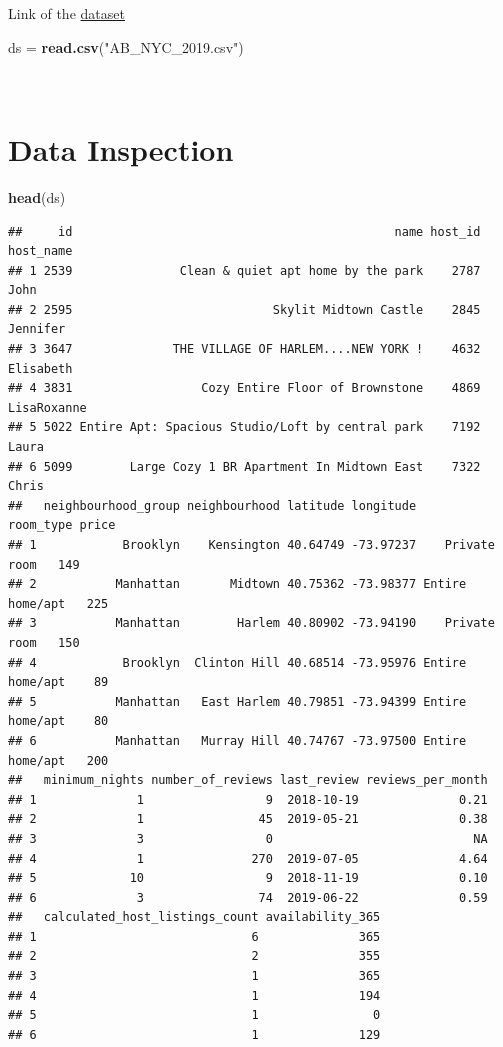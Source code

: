 \documentclass[
]{article}
\newenvironment{Shaded}{\begin{snugshade}}{\end{snugshade}}
\newcommand{\KeywordTok}[1]{\textcolor[rgb]{0.13,0.29,0.53}{\textbf{#1}}}
\newcommand{\NormalTok}[1]{#1}
\newcommand{\StringTok}[1]{\textcolor[rgb]{0.31,0.60,0.02}{#1}}
\begin{document}
Link of the
\href{https://www.kaggle.com/dgomonov/new-york-city-airbnb-open-data}{dataset}

\begin{Shaded}
\begin{Highlighting}[]
\NormalTok{ds =}\StringTok{ }\KeywordTok{read.csv}\NormalTok{(}\StringTok{"AB_NYC_2019.csv"}\NormalTok{)}
\end{Highlighting}
\end{Shaded}

~\\

\hypertarget{data-inspection}{%
\section{Data Inspection}\label{data-inspection}}

\begin{Shaded}
\begin{Highlighting}[]
\KeywordTok{head}\NormalTok{(ds)}
\end{Highlighting}
\end{Shaded}

\begin{verbatim}
##     id                                             name host_id   host_name
## 1 2539               Clean & quiet apt home by the park    2787        John
## 2 2595                            Skylit Midtown Castle    2845    Jennifer
## 3 3647              THE VILLAGE OF HARLEM....NEW YORK !    4632   Elisabeth
## 4 3831                  Cozy Entire Floor of Brownstone    4869 LisaRoxanne
## 5 5022 Entire Apt: Spacious Studio/Loft by central park    7192       Laura
## 6 5099        Large Cozy 1 BR Apartment In Midtown East    7322       Chris
##   neighbourhood_group neighbourhood latitude longitude       room_type price
## 1            Brooklyn    Kensington 40.64749 -73.97237    Private room   149
## 2           Manhattan       Midtown 40.75362 -73.98377 Entire home/apt   225
## 3           Manhattan        Harlem 40.80902 -73.94190    Private room   150
## 4            Brooklyn  Clinton Hill 40.68514 -73.95976 Entire home/apt    89
## 5           Manhattan   East Harlem 40.79851 -73.94399 Entire home/apt    80
## 6           Manhattan   Murray Hill 40.74767 -73.97500 Entire home/apt   200
##   minimum_nights number_of_reviews last_review reviews_per_month
## 1              1                 9  2018-10-19              0.21
## 2              1                45  2019-05-21              0.38
## 3              3                 0                            NA
## 4              1               270  2019-07-05              4.64
## 5             10                 9  2018-11-19              0.10
## 6              3                74  2019-06-22              0.59
##   calculated_host_listings_count availability_365
## 1                              6              365
## 2                              2              355
## 3                              1              365
## 4                              1              194
## 5                              1                0
## 6                              1              129
\end{verbatim}
\end{document}
